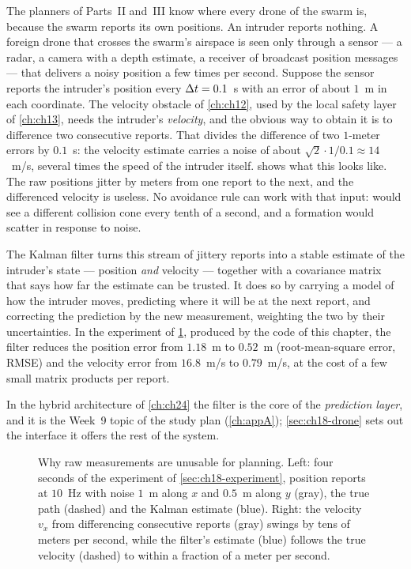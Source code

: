The planners of Parts~II and~III know where every drone of the swarm is,
because the swarm reports its own positions. An intruder reports nothing. A
foreign drone that crosses the swarm's airspace is seen only through a sensor
--- a radar, a camera with a depth estimate, a receiver of broadcast position
messages --- that delivers a noisy position a few times per second. Suppose
the sensor reports the intruder's position every $\Delta t=0.1$~s with an error of
about $1$~m in each coordinate. The velocity obstacle of \cref{ch:ch12},
used by the local safety layer of \cref{ch:ch13}, needs the intruder's
\emph{velocity}, and the obvious way to obtain it is to difference two consecutive reports. That
divides the difference of two $1$-meter errors by $0.1$~s: the velocity
estimate carries a noise of about $\sqrt2\cdot1/0.1\approx14$~m/s, several
times the speed of the intruder itself.  shows what this
looks like. The raw positions jitter by meters from one report to the next,
and the differenced velocity is useless. No avoidance rule can work with that
input: \orca would see a different collision cone every tenth of a second, and
a formation would scatter in response to noise.

The Kalman filter turns this stream of jittery reports into a stable estimate
of the intruder's state --- position \emph{and} velocity --- together with a
covariance matrix that says how far the estimate can be trusted. It does so by
carrying a model of how the intruder moves, predicting where it will be at the
next report, and correcting the prediction by the new measurement, weighting
the two by their uncertainties. In the experiment of \cref{fig:ch18-raw},
produced by the code of this chapter, the filter reduces the position error
from $1.18$~m to $0.52$~m (root-mean-square error, RMSE) and
the velocity error from $16.8$~m/s to $0.79$~m/s, at the cost of a few small matrix products per
report.

In the hybrid architecture of \cref{ch:ch24} the filter is the core of the
\emph{prediction layer}, and it is the Week~9 topic of the study plan
(\cref{ch:appA}); \cref{sec:ch18-drone} sets out the interface it offers the
rest of the system.

\begin{figure}[tb]
  \centering
  \caption{Why raw measurements are unusable for planning. Left: four seconds
  of the experiment of \cref{sec:ch18-experiment}, position reports at
  $10$~Hz with noise $1$~m along $x$ and $0.5$~m along $y$ (gray), the true
  path (dashed) and the Kalman estimate (blue). Right: the velocity $v_x$
  from differencing consecutive reports (gray) swings by tens of meters per
  second, while the filter's estimate (blue) follows the true velocity
  (dashed) to within a fraction of a meter per second.}
  \label{fig:ch18-raw}
\end{figure}

